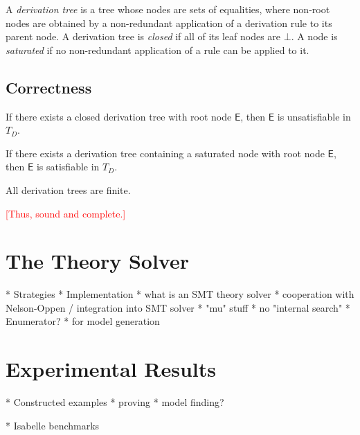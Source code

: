 \documentclass[a4paper,oribibl,envcountsame,draft]{llncs}
\newcommand{\Ec}{\mathsf{E}}
\newcommand{\rem}[1]{\textcolor{red}{[#1]}}
\newcommand{\thD}{T_{D}}
\begin{document}
A \emph{derivation tree} is a tree whose nodes are sets of equalities, where non-root nodes are obtained by a non-redundant application of a derivation rule to its parent node.
A derivation tree is \emph{closed} if all of its leaf nodes are $\bot$.
A node is \emph{saturated} if no non-redundant application of a rule can be applied to it.
  

\subsection{Correctness}

\begin{lemma}
If there exists a closed derivation tree with root node $\Ec$, then $\Ec$ is unsatisfiable in $\thD$.
\end{lemma}

\begin{lemma}
If there exists a derivation tree containing a saturated node with root node $\Ec$, then $\Ec$ is satisfiable in $\thD$.
\end{lemma}

\begin{lemma}[Termination]
All derivation trees are finite.
\end{lemma}

\rem{Thus, sound and complete.}
  
\section{The Theory Solver}
\label{sec:the-theory-solver}

  * Strategies
  * Implementation
    * what is an SMT theory solver
    * cooperation with Nelson-Oppen / integration into SMT solver
    * "mu" stuff
    * no "internal search"
  * Enumerator?
    * for model generation


\section{Experimental Results}
\label{sec:experimental-results}

  * Constructed examples
    * proving
    * model finding?

  * Isabelle benchmarks
\end{document}
